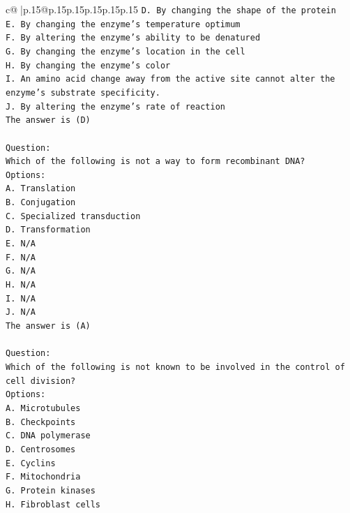 \documentclass{article}
\begin{document}
{\begin{supertabular}{c@{$\;$}|p{.15\linewidth}@{}p{.15\linewidth}p{.15\linewidth}p{.15\linewidth}p{.15\linewidth}p{.15\linewidth}}
{{{\texttt{D. By changing the shape of the protein} \\
\texttt{E. By changing the enzyme's temperature optimum} \\
\texttt{F. By altering the enzyme's ability to be denatured} \\
\texttt{G. By changing the enzyme’s location in the cell} \\
\texttt{H. By changing the enzyme's color} \\
\texttt{I. An amino acid change away from the active site cannot alter the enzyme’s substrate specificity.} \\
\texttt{J. By altering the enzyme's rate of reaction} \\
\texttt{The answer is (D)} \\
\\ 
\texttt{Question:} \\
\texttt{Which of the following is not a way to form recombinant DNA?} \\
\texttt{Options:} \\
\texttt{A. Translation} \\
\texttt{B. Conjugation} \\
\texttt{C. Specialized transduction} \\
\texttt{D. Transformation} \\
\texttt{E. N/A} \\
\texttt{F. N/A} \\
\texttt{G. N/A} \\
\texttt{H. N/A} \\
\texttt{I. N/A} \\
\texttt{J. N/A} \\
\texttt{The answer is (A)} \\
\\ 
\texttt{Question:} \\
\texttt{Which of the following is not known to be involved in the control of cell division?} \\
\texttt{Options:} \\
\texttt{A. Microtubules} \\
\texttt{B. Checkpoints} \\
\texttt{C. DNA polymerase} \\
\texttt{D. Centrosomes} \\
\texttt{E. Cyclins} \\
\texttt{F. Mitochondria} \\
\texttt{G. Protein kinases} \\
\texttt{H. Fibroblast cells} \\
}}}
\end{supertabular}}
\end{document}
